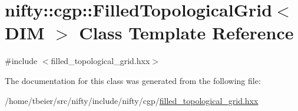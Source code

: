 \hypertarget{classnifty_1_1cgp_1_1FilledTopologicalGrid}{}\section{nifty\+:\+:cgp\+:\+:Filled\+Topological\+Grid$<$ D\+IM $>$ Class Template Reference}
\label{classnifty_1_1cgp_1_1FilledTopologicalGrid}


{\ttfamily \#include $<$filled\+\_\+topological\+\_\+grid.\+hxx$>$}



The documentation for this class was generated from the following file\+:\begin{DoxyCompactItemize}
\item 
/home/tbeier/src/nifty/include/nifty/cgp/\hyperlink{filled__topological__grid_8hxx}{filled\+\_\+topological\+\_\+grid.\+hxx}\end{DoxyCompactItemize}
